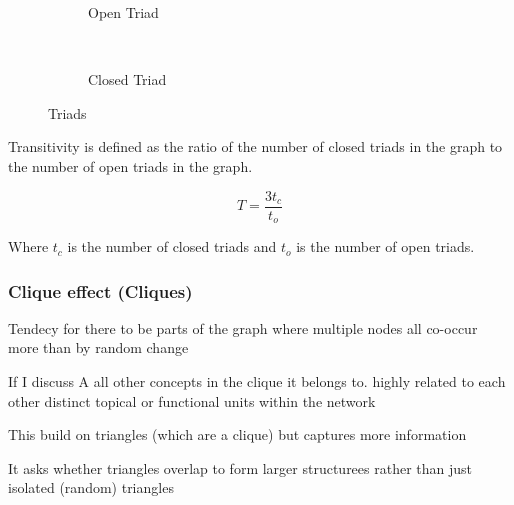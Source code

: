 \begin{figure}[H]
    \centering
    \begin{subfigure}[t]{0.4\textwidth}
        \centering
        \caption{Open Triad} 
        \label{fig:open_triad}
     \end{subfigure}
        ~
     \begin{subfigure}[t]{0.4\textwidth}
        \centering
        \caption{Closed Triad} 
        \label{fig:closed_triad}
     \end{subfigure}
     \caption{Triads}
\end{figure}

Transitivity is defined as the ratio of the number of closed triads in the graph to the number of open triads in the graph.

$$
T = \frac{3t_c}{t_o}
$$

Where $t_c$ is the number of closed triads and $t_o$ is the number of open triads.


\subsubsection{Clique effect (Cliques)}

Tendecy for there to be parts of the graph where multiple nodes all co-occur more than by random change

If I discuss 
A all other concepts in the clique it belongs to.
highly related to each other distinct topical or functional units within the network

This build on triangles (which are a clique) but captures more information 

It asks whether triangles overlap to form larger structurees rather than just isolated (random) triangles

